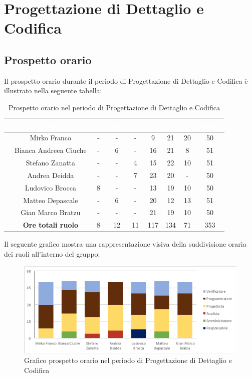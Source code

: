 \section{Progettazione di Dettaglio e Codifica}
\subsection{Prospetto orario}
Il prospetto orario durante il periodo di Progettazione di Dettaglio e Codifica è illustrato nella seguente tabella:

\begin{table}[ht]
	\begin{center}
		\begin{tabular}{ccccccccc}
			\rowcolor{coolblack}
			\hline
			& \textcolor{white}{Nome} & \textcolor{white}{Re} & \textcolor{white}{Am} & \textcolor{white}{An} & \textcolor{white}{Pt} &\textcolor{white}{Pr} & \textcolor{white}{Ve} & \textcolor{white}{Totale} \\
			\hline
			&Mirko Franco & - & - & - & 9 & 21 & 20 & 50  \\
			&Bianca Andreea Ciuche & -& 6& - & 16 & 21 & 8 & 51 \\
			&Stefano Zanatta & - & - & 4 & 15 & 22 & 10 & 51 \\
			&Andrea Deidda &  -& - & 7 & 23 & 20 & - & 50 \\
			&Ludovico Brocca & 8& - & - & 13 & 19 & 10 & 50 \\
			&Matteo Depascale & -& 6& - & 20 & 12 & 13 & 51 \\
			&Gian Marco Bratzu & -& - & - & 21 & 19 & 10 & 50 \\
			\hline
			&\textbf{Ore totali ruolo} & 8 & 12 & 11 & 117 & 134 & 71 & 353 \\
		\end{tabular}
	\caption{Prospetto orario nel periodo di Progettazione di Dettaglio e Codifica}
	\end{center}
\end{table}

Il seguente grafico mostra una rappresentazione visiva della suddivisione oraria dei ruoli all'interno del gruppo:
\begin{figure}[!ht]
	\begin{center}
		\includegraphics[scale=0.80]{images/grafoProgettazioneDettaglioCodifica.png}
		\caption{Grafico prospetto orario nel periodo di Progettazione di Dettaglio e Codifica}
	\end{center}
\end{figure}

